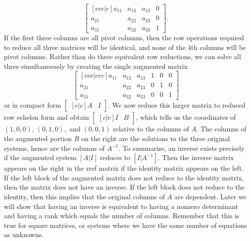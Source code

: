 {$$\begin{bmatrix}[ccc|c]
a_{11}&a_{12}&a_{13}&0\\ 
a_{21}&a_{22}&a_{23}&0\\ 
a_{31}&a_{32}&a_{33}&1 
\end{bmatrix}.
$$
If the first three columns are all pivot columns, then the row operations required to reduce all three matrices will be identical, and none of the 4th columns will be pivot columns.  Rather than do three equivalent row reductions, we can solve all three simultaneously by creating the single augmented matrix 
$$\begin{bmatrix}[ccc|ccc]
a_{11}&a_{12}&a_{13}&1&0&0\\ 
a_{21}&a_{22}&a_{23}&0&1&0\\ 
a_{31}&a_{32}&a_{33}&0&0&1 
\end{bmatrix} $$or in compact form $\begin{bmatrix}[c|c]A &I\end{bmatrix}$. We now reduce this larger matrix to reduced row echelon form and obtain $\begin{bmatrix}[c|c]I &B\end{bmatrix}$, which tells us the coordinates of $(1,0,0)$, $(0,1,0),$ and  $(0,0,1)$ relative to the columns of $A$. 
The columns of the augmented portion $B$ on the right are the solutions to the three original systems, hence are the columns of $A^{-1}$.
To summarize, an inverse exists precisely if the augmented system $[A|I]$ reduces to $[I|A^{-1}]$. 
Then the inverse matrix appears on the right in the rref matrix if the identity matrix appears on the left.
If the left block of the augmented matrix does not reduce to the identity matrix, then the matrix does not have an inverse.
If the left block does not reduce to the identity, then this implies that the original columns of $A$ are dependent.  
Later we will show that having an inverse is equivalent to having a nonzero determinant and having a rank which equals the number of columns. Remember that this is true for square matrices, or systems where we have the same number of equations as unknowns.

}
